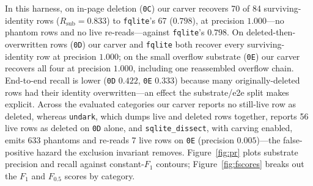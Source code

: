 \documentclass[10pt,a4paper]{article}
\newcommand{\code}[1]{\texttt{#1}}
\begin{document}
In this harness, on in-page deletion (\code{0C}) our carver recovers 70 of 84
surviving-identity rows ($R_{\mathrm{sub}}=0.833$) to \code{fqlite}'s 67
($0.798$), at precision $1.000$---no phantom rows and no live re-reads---against
\code{fqlite}'s $0.798$. On deleted-then-overwritten rows (\code{0D}) our carver and
\code{fqlite} both recover every surviving-identity row at precision $1.000$; on the
small overflow substrate (\code{0E}) our carver recovers all four at precision
$1.000$, including one reassembled overflow chain. End-to-end recall is lower
(\code{0D} $0.422$, \code{0E} $0.333$) because many originally-deleted rows had their
identity overwritten---an effect the substrate/e2e split makes explicit. Across the
evaluated categories our carver reports no still-live row as deleted, whereas
\code{undark}, which dumps live and deleted rows together, reports 56 live rows as
deleted on \code{0D} alone, and \code{sqlite\_dissect}, with carving enabled, emits
633 phantoms and re-reads 7 live rows on \code{0E} (precision $0.005$)---the
false-positive hazard the exclusion invariant removes. Figure~\ref{fig:pr} plots
substrate precision and recall against
constant-$F_1$ contours; Figure~\ref{fig:fscores} breaks out the $F_1$ and
$F_{0.5}$ scores by category.
\end{document}
